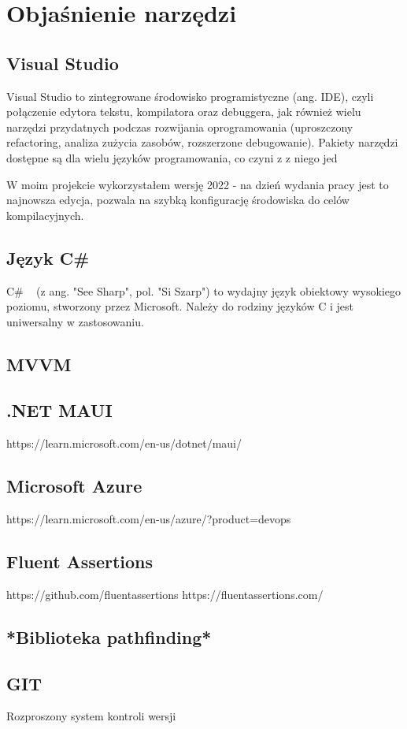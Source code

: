 \section{Objaśnienie narzędzi}

\subsection{Visual Studio}

Visual Studio to zintegrowane środowisko programistyczne (ang. IDE), czyli połączenie edytora tekstu,
kompilatora oraz debuggera, jak również wielu narzędzi przydatnych podczas rozwijania oprogramowania
(uproszczony refactoring, analiza zużycia zasobów, rozszerzone debugowanie). Pakiety narzędzi dostępne są dla wielu
języków programowania, co czyni z z niego jed

W moim projekcie wykorzystałem wersję 2022 - na dzień wydania pracy jest to najnowsza edycja,
pozwala na szybką konfigurację środowiska do celów kompilacyjnych.

\subsection{Język C\#}

C\# ~\cite{csharpDocs} (z ang. "See Sharp", pol. "Si Szarp") to wydajny język obiektowy wysokiego poziomu, stworzony przez Microsoft.
Należy do rodziny języków C i jest uniwersalny w zastosowaniu.

\subsection{MVVM}

\subsection{.NET MAUI}
https://learn.microsoft.com/en-us/dotnet/maui/

\subsection{Microsoft Azure}
https://learn.microsoft.com/en-us/azure/?product=devops

\subsection{Fluent Assertions}
https://github.com/fluentassertions
https://fluentassertions.com/


\subsection{*Biblioteka pathfinding*}

\subsection{GIT}
Rozproszony system kontroli wersji 
